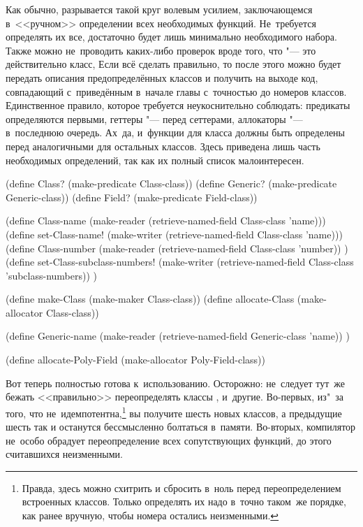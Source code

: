 Как обычно, разрывается такой круг волевым усилием, заключающемся в~<<ручном>>
определении всех необходимых функций. Не~требуется определять их все, достаточно
будет лишь минимально необходимого набора. Также можно не~проводить каких-либо
проверок вроде того, что  "--- это действительно класс, {\itp}
Если всё сделать правильно, то после этого можно будет передать
 описания предопределённых классов и получить на выходе код,
совпадающий с~приведённым в~начале главы с~точностью до номеров классов.
Единственное правило, которое требуется неукоснительно соблюдать: предикаты
определяются первыми, геттеры "--- перед сеттерами, аллокаторы "--- в~последнюю
очередь. Ах~да, и~функции для класса  должны быть определены перед
аналогичными для остальных классов. Здесь приведена лишь часть необходимых
определений, так как их полный список малоинтересен.

\begin{code:lisp}
(define Class?   (make-predicate Class-class))
(define Generic? (make-predicate Generic-class))
(define Field?   (make-predicate Field-class))

(define Class-name
  (make-reader (retrieve-named-field Class-class 'name)))
(define set-Class-name!
  (make-writer (retrieve-named-field Class-class 'name)))
(define Class-number
  (make-reader (retrieve-named-field Class-class 'number)) )
(define set-Class-subclass-numbers!
  (make-writer (retrieve-named-field Class-class 'subclass-numbers)) )

(define make-Class (make-maker Class-class))
(define allocate-Class (make-allocator Class-class))

(define Generic-name
  (make-reader (retrieve-named-field Generic-class 'name)) )

(define allocate-Poly-Field (make-allocator Poly-Field-class))
\end{code:lisp}

Вот теперь  полностью готова к~использованию. Осторожно:
не~следует тут~же бежать <<правильно>> переопределять классы ,
 и~другие. Во-первых, из"~за того, что 
не~идемпотентна,\footnote*{Правда, здесь можно схитрить и сбросить
 в~ноль перед переопределением встроенных классов. Только
определять их надо в~точно таком~же порядке, как ранее вручную, чтобы номера
остались неизменными.} вы получите шесть новых классов, а предыдущие шесть так
и останутся бессмысленно болтаться в~памяти. Во-вторых, компилятор не~особо
обрадует переопределение всех сопутствующих функций, до этого считавшихся
неизменными.


